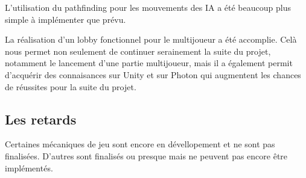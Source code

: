 L'utilisation du pathfinding pour les mouvements des IA a été beaucoup plus simple à implémenter que prévu.

La réalisation d'un lobby fonctionnel pour le multijoueur a été accomplie. Celà nous permet non seulement de continuer serainement la suite du projet, notamment le lancement d'une partie multijoueur, mais il a également permit d'acquérir des connaisances sur Unity et sur Photon qui augmentent les chances de réussites pour la suite du projet.




\subsection{Les retards}

Certaines mécaniques de jeu sont encore en dévellopement et ne sont pas finalisées.
D'autres sont finalisés ou presque mais ne peuvent pas encore être implémentés.
    
